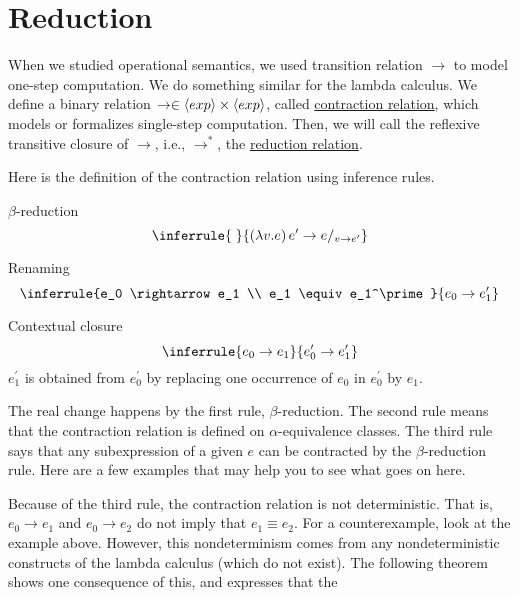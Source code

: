 \section{Reduction}

\begin{enumcirc}
	\item
	When we studied operational semantics, we used transition relation
	$\rightarrow$ to model one-step computation.
	We do something similar for the lambda calculus.
	We define a binary relation
	$\rightarrow \in \left\langle exp \right\rangle \times \left\langle exp \right\rangle$,
	called \ul{contraction relation}, which models or formalizes single-step
	computation.
	Then, we will call the reflexive transitive closure of $\rightarrow$, i.e.,
	$\rightarrow^*$, the \ul{reduction relation}.
	\item
	Here is the definition of the contraction relation using inference rules.
	\begin{enumrm}
		\item
		$\beta$-reduction
		\[
			\inferrule
			{\;}
			{\prths{\lambda v. e}{e^\prime} \rightarrow \subst{e}{v}{e^\prime}}
		\]
		\item
		Renaming
		\[
			\inferrule
			{e_0 \rightarrow e_1 \\ e_1 \equiv e_1^\prime}
			{e_0 \rightarrow e_1^\prime}
		\]
		\item
		Contextual closure
		\[
			\inferrule
			{e_0 \rightarrow e_1}
			{e_0^\prime \rightarrow e_1^\prime}
		\]
		$e_1^\prime$ is obtained from $e_0^\prime$ by replacing one occurrence of
		$e_0$ in $e_0^\prime$ by $e_1$.
	\end{enumrm}
	\item
	The real change happens by the first rule, $\beta$-reduction.
	The second rule means that the contraction relation is defined on
	$\alpha$-equivalence classes.
	The third rule says that any subexpression of a given $e$ can be contracted by
	the $\beta$-reduction rule.
	Here are a few examples that may help you to see what goes on here.
	\todo
	\item
	Because of the third rule, the contraction relation is not deterministic.
	That is, $e_0 \rightarrow e_1$ and $e_0 \rightarrow e_2$ do not imply that $e_1
		\equiv e_2$.
	For a counterexample, look at the example above.
	However, this nondeterminism comes from any nondeterministic constructs of the
	lambda calculus (which do not exist).
	The following theorem shows one consequence of this, and expresses that the

\end{enumcirc}
